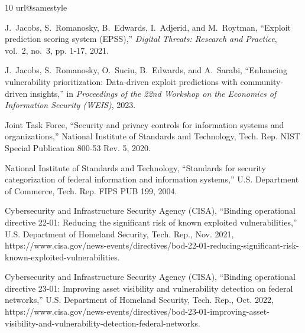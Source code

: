 \documentclass[journal]{IEEEtran}
\begin{document}
\begin{thebibliography}{10}
\providecommand{\url}[1]{#1}
\csname url@samestyle\endcsname
\providecommand{\newblock}{\relax}
\providecommand{\bibinfo}[2]{#2}
\providecommand{\BIBentrySTDinterwordspacing}{\spaceskip=0pt\relax}
\providecommand{\BIBentryALTinterwordstretchfactor}{4}
\providecommand{\BIBentryALTinterwordspacing}{\spaceskip=\fontdimen2\font plus
\BIBentryALTinterwordstretchfactor\fontdimen3\font minus
  \fontdimen4\font\relax}
\providecommand{\BIBforeignlanguage}[2]{{%
\expandafter\ifx\csname l@#1\endcsname\relax
\typeout{** WARNING: IEEEtran.bst: No hyphenation pattern has been}%
\typeout{** loaded for the language `#1'. Using the pattern for}%
\typeout{** the default language instead.}%
\else
\language=\csname l@#1\endcsname
\fi
#2}}
\providecommand{\BIBdecl}{\relax}
\BIBdecl

J.~Jacobs, S.~Romanosky, B.~Edwards, I.~Adjerid, and M.~Roytman, ``Exploit
  prediction scoring system ({EPSS}),'' \emph{Digital Threats: Research and
  Practice}, vol.~2, no.~3, pp. 1-17, 2021.

J.~Jacobs, S.~Romanosky, O.~Suciu, B.~Edwards, and A.~Sarabi, ``Enhancing
  vulnerability prioritization: Data-driven exploit predictions with
  community-driven insights,'' in \emph{Proceedings of the 22nd Workshop on the
  Economics of Information Security (WEIS)}, 2023.

{Joint Task Force}, ``Security and privacy controls for information systems and
  organizations,'' National Institute of Standards and Technology, Tech. Rep.
  NIST Special Publication 800-53 Rev. 5, 2020.

{National Institute of Standards and Technology}, ``Standards for security
  categorization of federal information and information systems,'' U.S.
  Department of Commerce, Tech. Rep. FIPS PUB 199, 2004.

{Cybersecurity and Infrastructure Security Agency (CISA)}, ``Binding
  operational directive 22-01: Reducing the significant risk of known exploited
  vulnerabilities,'' U.S. Department of Homeland Security, Tech. Rep., Nov.
  2021,
  \url{https://www.cisa.gov/news-events/directives/bod-22-01-reducing-significant-risk-known-exploited-vulnerabilities}.

{Cybersecurity and Infrastructure Security Agency (CISA)}, ``Binding
  operational directive 23-01: Improving asset visibility and vulnerability
  detection on federal networks,'' U.S. Department of Homeland Security, Tech.
  Rep., Oct. 2022,
  \url{https://www.cisa.gov/news-events/directives/bod-23-01-improving-asset-visibility-and-vulnerability-detection-federal-networks}.


\end{thebibliography}
\end{document}
